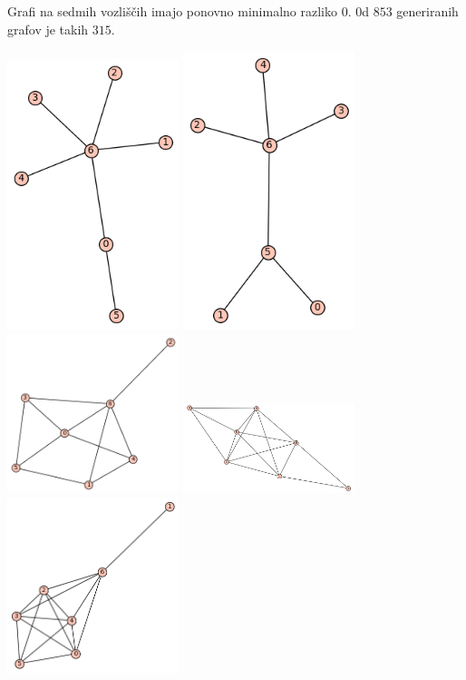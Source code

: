 \documentclass[10pt, a4paper]{article}
\begin{document}
Grafi na sedmih vozliščih imajo ponovno minimalno razliko $0$. 0d $853$ generiranih grafov je takih $315$.

\includegraphics[width=5cm]{min_graf_7.1_vozlisca}
\includegraphics[width=5cm]{min_graf_7.2_vozlisca}
\includegraphics[width=5cm]{min_graf_7.3_vozlisca}
\includegraphics[width=5cm]{min_graf_7.4_vozlisca}
\includegraphics[width=5cm]{min_graf_7.5_vozlisca}
\end{document}
